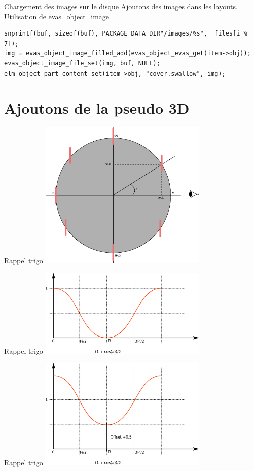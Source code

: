 \documentclass{beamer}
\begin{document}
\begin{frame}[fragile]{Chargement des images sur le disque}
Ajoutons des images dans les layouts. \\
Utilisation de evas\_object\_image
\begin{lstlisting}
snprintf(buf, sizeof(buf), PACKAGE_DATA_DIR"/images/%s",  files[i % 7]);
img = evas_object_image_filled_add(evas_object_evas_get(item->obj));
evas_object_image_file_set(img, buf, NULL);
elm_object_part_content_set(item->obj, "cover.swallow", img);
\end{lstlisting}
\end{frame}

\section{Ajoutons de la pseudo 3D}


\begin{frame}[fragile]{Rappel trigo}
\includegraphics[width=8cm]{trigo.eps}
\end{frame}


\begin{frame}[fragile]{Rappel trigo}
\includegraphics[width=8cm]{cosa.eps}
\end{frame}

\begin{frame}[fragile]{Rappel trigo}
\includegraphics[width=8cm]{cosb.eps}
\end{frame}
\end{document}
